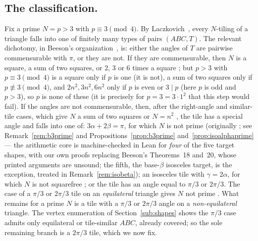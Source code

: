 \documentclass[11pt,reqno]{amsart}
\theoremstyle{plain}
\theoremstyle{definition}
\begin{document}
\subsection*{The classification.}
Fix a prime $N=p>3$ with $p\equiv 3\pmod 4$. By Laczkovich~\cite{Laczkovich1995,Laczkovich2012},
every $N$-tiling of a triangle falls into one of finitely many types of pairs $(ABC,T)$. The
relevant dichotomy, in Beeson's organization~\cite{BeesonSeven}, is: either the angles of $T$ are
pairwise commensurable with $\pi$, or they are not. If they are commensurable, then $N$ is a square,
a sum of two squares, or $2$, $3$ or $6$ times a square \cite[Thm.~3 and Table~3]{BeesonSeven}; but
$p>3$ with $p\equiv3\pmod4$ is a square only if $p$ is one (it is not), a sum of two squares only if
$p\not\equiv3\pmod4$, and $2n^2,3n^2,6n^2$ only if $p$ is even or $3\mid p$ (here $p$ is odd and
$p>3$), so $p$ is none of these (it is precisely for $p=3=3\cdot1^2$ that this step would fail).
If the angles are not commensurable, then, after the right-angle and similar-tile cases, which give
$N$ a sum of two squares or $N=n^2$ \cite{BeesonI, SWW}, the tile has a special angle and falls into
one of: $3\alpha+2\beta=\pi$, for which $N$ is not prime (originally \cite{BeesonIII}; see
Remark~\ref{rem:b3prime} and Propositions~\ref{prop:b3prime} and~\ref{prop:isoalphaprime} ---
the arithmetic core is machine-checked in Lean for \emph{four} of the five target shapes, with our
own proofs replacing Beeson's Theorems~18 and~20, whose printed arguments are unsound; the fifth,
the base-$\beta$ isosceles target, is the exception, treated in
Remark~\ref{rem:isobeta}); an isosceles tile with
$\gamma=2\alpha$, for which $N$ is not squarefree \cite[Thm.~11.7]{BeesonIso}; or the tile has an
angle equal to $\pi/3$ or $2\pi/3$. The case of a $\pi/3$ or $2\pi/3$ tile on an \emph{equilateral}
triangle gives $N$ not prime \cite{BeesonEq}. What remains for a prime $N$ is a tile with a $\pi/3$
or $2\pi/3$ angle on a \emph{non-equilateral} triangle. The vertex enumeration of
Section~\ref{sub:shapes} shows the $\pi/3$ case admits only equilateral or tile-similar $ABC$,
already covered; so the sole remaining branch is a $2\pi/3$ tile, which we now fix.
\end{document}
